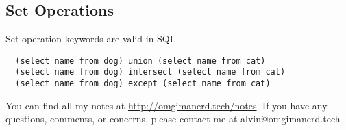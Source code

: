 \documentclass{math}
\begin{document}
\subsection*{Set Operations}
Set operation keywords are valid in SQL.
\begin{lstlisting}
  (select name from dog) union (select name from cat)
  (select name from dog) intersect (select name from cat)
  (select name from dog) except (select name from cat)
\end{lstlisting}

\begin{center}
  You can find all my notes at \url{http://omgimanerd.tech/notes}. If you have
  any questions, comments, or concerns, please contact me at
  alvin@omgimanerd.tech
\end{center}
\end{document}
